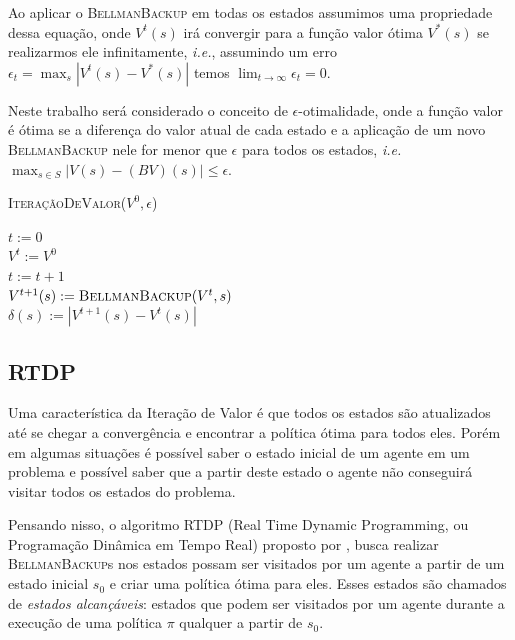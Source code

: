 \documentclass[letterpaper]{article}
\begin{document}
Ao aplicar o \textsc{BellmanBackup} em todas os estados assumimos uma propriedade dessa equação, onde $V^t(s)$ irá convergir para a função valor ótima $V^*(s)$ se realizarmos ele infinitamente, \textit{i.e.}, assumindo um erro $\epsilon_t = \max_s |V^t(s)-V^*(s)|$ temos $\lim_{t \rightarrow \infty} \epsilon_t = 0$.

Neste trabalho será considerado o conceito de $\epsilon$-otimalidade, onde a função valor é ótima se a diferença do valor atual de cada estado e a aplicação de um novo \textsc{BellmanBackup} nele for menor que $\epsilon$ para todos os estados, \textit{i.e.} $ \max_{s \in S} | V(s) - (BV)(s) | \leq \epsilon $.

\linesnumbered
\dontprintsemicolon
\begin{algorithm}[t!]
{
	\caption{\textsc{IteraçãoDeValor}($ V^0, \epsilon $)}
	\label{alg:iteracao-valor}
    $t := 0$\\
    $V^t := V^0$\\

    {
        $t := t + 1$\\

        {
            $V^{t+1}(s) := \textsc{BellmanBackup}(V^{t}, s)$ \\
            $\delta(s) := | V^{t+1}(s) - V^t(s) | $
        }
    }

}
\end{algorithm}


\subsection{RTDP}

Uma característica da Iteração de Valor é que todos os estados são atualizados até se chegar a convergência e encontrar a política ótima para todos eles. Porém em algumas situações é possível saber o estado inicial de um agente em um problema e possível saber que a partir deste estado o agente não conseguirá visitar todos os estados do problema.

Pensando nisso, o algoritmo RTDP (Real Time Dynamic Programming, ou Programação Dinâmica em Tempo Real) proposto por \cite{BartoBradtkeSingh-1995}, busca realizar \textsc{BellmanBackup}s nos estados possam ser visitados por um agente a partir de um estado inicial $s_0$ e criar uma política ótima para eles. Esses estados são chamados de \emph{estados alcançáveis}: estados que podem ser visitados por um agente durante a execução de uma política $\pi$ qualquer a partir de $s_0$.
\end{document}
